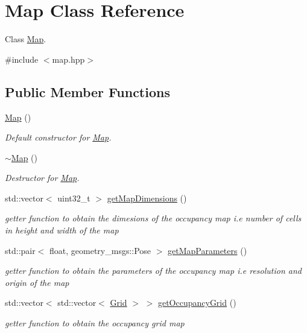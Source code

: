 \hypertarget{classMap}{}\section{Map Class Reference}
\label{classMap}


Class \hyperlink{classMap}{Map}.  




{\ttfamily \#include $<$map.\+hpp$>$}

\subsection*{Public Member Functions}
\begin{DoxyCompactItemize}
\item 
\hyperlink{classMap_a0f5ad0fd4563497b4214038cbca8b582}{Map} ()
\begin{DoxyCompactList}\small\item\em Default constructor for \hyperlink{classMap}{Map}. \end{DoxyCompactList}\item 
\hyperlink{classMap_aa403fbe09394ccf39747588f5168e3b2}{$\sim$\+Map} ()
\begin{DoxyCompactList}\small\item\em Destructor for \hyperlink{classMap}{Map}. \end{DoxyCompactList}\item 
std\+::vector$<$ uint32\+\_\+t $>$ \hyperlink{classMap_a0407f962dee93f27fd4a4e463cf0f3b1}{get\+Map\+Dimensions} ()
\begin{DoxyCompactList}\small\item\em getter function to obtain the dimesions of the occupancy map i.\+e number of cells in height and width of the map \end{DoxyCompactList}\item 
std\+::pair$<$ float, geometry\+\_\+msgs\+::\+Pose $>$ \hyperlink{classMap_af6dd728dc6d4cb1a7f12968a702781bf}{get\+Map\+Parameters} ()
\begin{DoxyCompactList}\small\item\em getter function to obtain the parameters of the occupancy map i.\+e resolution and origin of the map \end{DoxyCompactList}\item 
std\+::vector$<$ std\+::vector$<$ \hyperlink{classGrid}{Grid} $>$ $>$ \hyperlink{classMap_adc3926804632dcaa2484c552566f7283}{get\+Occupancy\+Grid} ()
\begin{DoxyCompactList}\small\item\em getter function to obtain the occupancy grid map \end{DoxyCompactList}\item 

\end{DoxyCompactItemize}
